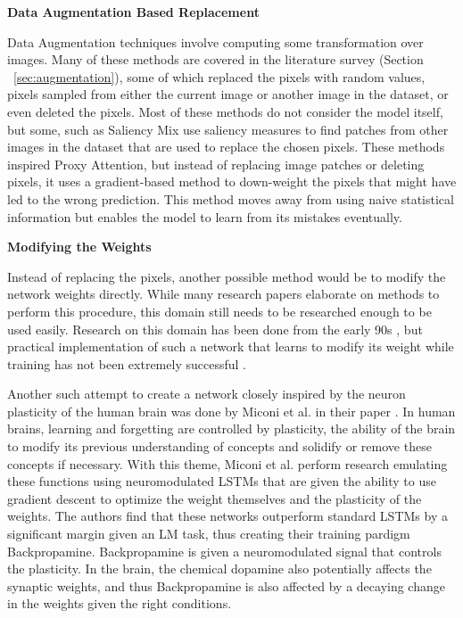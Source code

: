 \documentclass[a4paper,11pt,openright]{book}
\begin{document}
\textbf{Data Augmentation Based Replacement}

Data Augmentation techniques involve computing some transformation over images. Many of these methods are covered in the literature survey (Section ~\ref{sec:augmentation}), some of which replaced the pixels with random values, pixels sampled from either the current image or another image in the dataset, or even deleted the pixels. Most of these methods do not consider the model itself, but some, such as Saliency Mix \cite{uddinSaliencyMixSaliencyGuided2021} use saliency measures to find patches from other images in the dataset that are used to replace the chosen pixels.
These methods inspired Proxy Attention, but instead of replacing image patches or deleting pixels, it uses a gradient-based method to down-weight the pixels that might have led to the wrong prediction. This method moves away from using naive statistical information but enables the model to learn from its mistakes eventually.


\textbf{Modifying the Weights} 

Instead of replacing the pixels, another possible method would be to modify the network weights directly. While many research papers elaborate on methods to perform this procedure, this domain still needs to be researched enough to be used easily. Research on this domain has been done from the early 90s \cite{schmidhuberSelfReferentialWeightMatrix1993}, but practical implementation of such a network that learns to modify its weight while training has not been extremely successful \cite{irieModernSelfReferentialWeight2022}. 

Another such attempt to create a network closely inspired by the neuron plasticity of the human brain was done by Miconi et al. in their paper \cite{miconiBackpropamineTrainingSelfmodifying2020}. In human brains, learning and forgetting are controlled by plasticity, the ability of the brain to modify its previous understanding of concepts and solidify or remove these concepts if necessary. With this theme, Miconi et al. perform research emulating these functions using neuromodulated LSTMs that are given the ability to use gradient descent to optimize the weight themselves and the plasticity of the weights. The authors find that these networks outperform standard LSTMs by a significant margin given an LM task, thus creating their training pardigm Backpropamine. Backpropamine is given a neuromodulated signal that controls the plasticity. In the brain, the chemical dopamine also potentially affects the synaptic weights, and thus Backpropamine is also affected by a decaying change in the weights given the right conditions.
\end{document}
